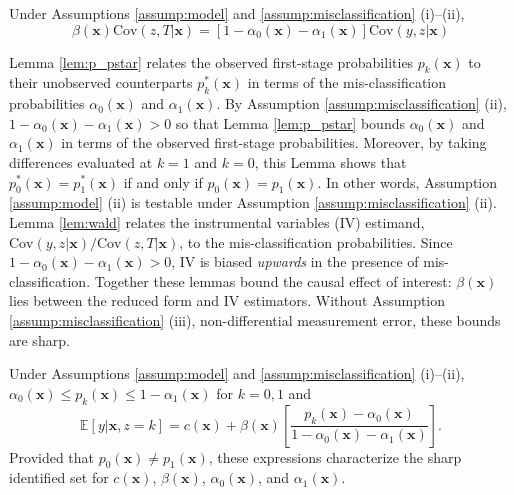 \begin{lem}
  \label{lem:wald}
  Under Assumptions \ref{assump:model} and \ref{assump:misclassification} (i)--(ii), $$\beta(\mathbf{x}) \mbox{Cov}(z,T|\mathbf{x}) = \left[ 1 - \alpha_0(\mathbf{x}) - \alpha_1(\mathbf{x}) \right]\mbox{Cov}(y,z|\mathbf{x})$$
\end{lem}

Lemma \ref{lem:p_pstar} relates the observed first-stage probabilities $p_k(\mathbf{x})$ to their unobserved counterparts $p^*_k(\mathbf{x})$ in terms of the mis-classification probabilities $\alpha_0(\mathbf{x})$ and $\alpha_1(\mathbf{x})$.
By Assumption \ref{assump:misclassification} (ii), $1 - \alpha_0(\mathbf{x}) - \alpha_1(\mathbf{x}) > 0$ so that Lemma \ref{lem:p_pstar} bounds $\alpha_0(\mathbf{x})$ and $\alpha_1(\mathbf{x})$ in terms of the observed first-stage probabilities.
Moreover, by taking differences evaluated at $k=1$ and $k=0$, this Lemma shows that $p_0^*(\mathbf{x}) = p_1^*(\mathbf{x})$ if and only if $p_0(\mathbf{x})=p_1(\mathbf{x})$.
In other words, Assumption \ref{assump:model} (ii) is testable under Assumption \ref{assump:misclassification} (ii).
Lemma \ref{lem:wald} relates the instrumental variables (IV) estimand, $\mbox{Cov}(y,z|\mathbf{x})/\mbox{Cov}(z,T|\mathbf{x})$, to the mis-classification probabilities.
Since $1 - \alpha_0(\mathbf{x}) - \alpha_1(\mathbf{x}) > 0$, IV is biased \emph{upwards} in the presence of mis-classification.
Together these lemmas bound the causal effect of interest: $\beta(\mathbf{x})$ lies between the reduced form and IV estimators.
Without Assumption \ref{assump:misclassification} (iii), non-differential measurement error, these bounds are sharp.

\begin{thm}
  Under Assumptions \ref{assump:model} and \ref{assump:misclassification} (i)--(ii), $\alpha_0(\mathbf{x}) \leq p_k(\mathbf{x}) \leq 1 -  \alpha_1(\mathbf{x})$ for  $k = 0, 1$ and
  \begin{equation}
    \mathbb{E}[y|\mathbf{x},z=k] = c(\mathbf{x}) + \beta(\mathbf{x}) \left[\frac{p_k(\mathbf{x}) - \alpha_0(\mathbf{x})}{1 - \alpha_0(\mathbf{x}) - \alpha_1(\mathbf{x})}\right].
    \label{eq:identsetI}
  \end{equation}
Provided that $p_0(\mathbf{x}) \neq p_1(\mathbf{x})$, these expressions characterize the sharp identified set for $c(\mathbf{x})$, $\beta(\mathbf{x})$, $\alpha_0(\mathbf{x})$, and $\alpha_1(\mathbf{x})$.
  \label{thm:sharpI}
\end{thm}


